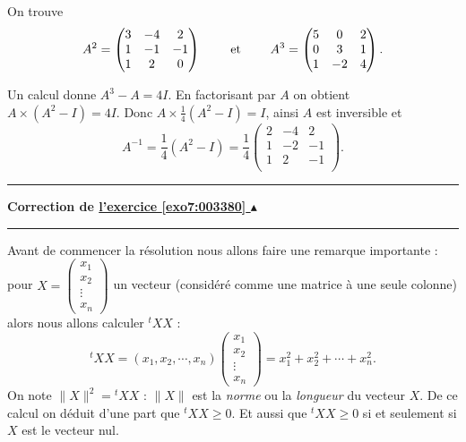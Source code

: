 \documentclass[11pt,a4paper]{article}
\renewcommand{\ge}{\geqslant} \renewcommand{\geq}{\geqslant}
\newcounter{exo}
\newcommand{\correction}[1]{\hypertarget{cor7:#1}{}\label{cor7:#1}{\bf Correction de \hyperlink{exo7:#1}{l'exercice \ref{exo7:#1} $\blacktriangle$}}\vspace{1mm}\hrule\vspace{1mm}}
\newcommand{\fincorrection}{\vspace{1mm}\hrule\vspace*{7mm}}
\begin{document}
On trouve 
$$A^2 =
\begin{pmatrix} 
3 & -4 & 2 \cr
1 & -1 & -1 \cr
1 & 2 & 0 \cr
\end{pmatrix}
\qquad \text{ et } \qquad 
A^3=
\begin{pmatrix} 
5 & 0 & 2 \cr
0 & 3 & 1 \cr
1 & -2 & 4 \cr
\end{pmatrix}
.$$

Un calcul donne $A^3-A = 4 I$.
En factorisant par $A$ on obtient $A\times (A^2-I) = 4I$.
Donc $A \times \frac 1 4 (A^2-I) = I$, ainsi $A$ est inversible et
$$A^{-1} = \frac 1 4 (A^2-I) = \frac 1 4
\begin{pmatrix}
2&-4&2\\
1&-2&-1\\
1&2&-1\\
\end{pmatrix}.
$$
\fincorrection
\correction{003380}

Avant de commencer la résolution nous allons faire une remarque importante :
pour $X = \begin{pmatrix}x_1 \\ x_2 \\ \vdots \\ x_n \end{pmatrix}$ un vecteur 
(considéré comme une matrice à une seule colonne)
alors nous allons calculer ${}^t\!X X$ : 
$${}^t\!X X = (x_1,x_2,\cdots,x_n) \begin{pmatrix}x_1 \\ x_2 \\ \vdots \\ x_n \end{pmatrix} = x_1^2+x_2^2+\cdots+x_n^2.$$
On note $ \| X \|^2 = {}^t\!X X$ : $\| X \|$ est la \emph{norme} ou la \emph{longueur} du vecteur $X$.
De ce calcul on déduit d'une part que ${}^t\!X X \ge 0$. Et aussi que  ${}^t\!X X \ge 0$ si et seulement si
$X$ est le vecteur nul.
\end{document}
